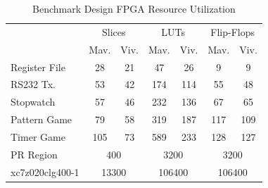\begin{table}[t]
	\caption{Benchmark Design FPGA Resource Utilization}
	\label{tab:tab1}
	\begin{center}
		\begin{tabular}{|l|cc|cc|cc|}
			\toprule
			\multirow{2}{*}{}&\multicolumn{2}{c|}{Slices}&\multicolumn{2}{c|}{LUTs}&\multicolumn{2}{c|}{Flip-Flops}\\
			&Mav.&Viv.&Mav.&Viv.&Mav.&Viv.\\
			\midrule
			Register File & 28 & 21 &47 & 26 & 9 & 9\\
			RS232 Tx. & 53 & 42 & 174 & 114 & 55 & 48\\
			Stopwatch & 57 & 46 & 232 & 136 & 67 & 65\\
			Pattern Game & 79 & 58 & 319 & 187 & 117 & 109\\
			Timer Game & 105 & 73 & 589 & 233 & 128 & 127\\
			\midrule
			PR Region & \multicolumn{2}{c|}{400} & \multicolumn{2}{c|}{3200} & \multicolumn{2}{c|}{3200}\\
			xc7z020clg400-1 & \multicolumn{2}{c|}{13300} & \multicolumn{2}{c|}{106400} & \multicolumn{2}{c|}{106400}\\
			\bottomrule
		\end{tabular}
	\end{center}
\end{table}
